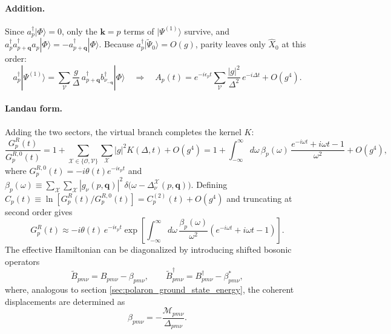 \paragraph{Addition.}
Since $a_p^\dagger|\Phi\rangle=0$, only the $\bm k=p$ terms of $|\Psi^{(1)}\rangle$ survive, and $a_p^\dagger a^\dagger_{p+\bm q}a_p|\Phi\rangle=-a^\dagger_{p+\bm q}|\Phi\rangle$. Because $a_p^\dagger|\tilde\Psi_0\rangle=O(g)$, parity leaves only $\hat X_0$ at this order:
\begin{equation}
a_p^\dagger|\Psi^{(1)}\rangle=\sum_{\mathcal V}\frac{g}{\Delta}\,a^\dagger_{p+\bm q}b^\dagger_{\nu_{-\bm q}}|\Phi\rangle
\quad\Longrightarrow\quad
A_p(t)=e^{-i\epsilon_pt}\sum_{\mathcal V}\frac{|g|^2}{\Delta^2}\,e^{-i\Delta t}+O(g^4).
\end{equation}

\paragraph{Landau form.}
Adding the two sectors, the virtual branch completes the kernel $K$:
\begin{equation}
\frac{G_p^R(t)}{G_p^{R,0}(t)}=1+\sum_{\mathcal X\in\{\mathcal O,\mathcal V\}}\sum_{\mathcal X}|g|^2K(\Delta,t)+O(g^4)
=1+\int_{-\infty}^{\infty}d\omega\,\beta_p(\omega)\,\frac{e^{-i\omega t}+i\omega t-1}{\omega^2}+O(g^4),
\end{equation}
where $G_p^{R,0}(t)=-i\theta(t)e^{-i\epsilon_pt}$ and
$\beta_p(\omega)\equiv\sum_{\mathcal X}\sum_{\mathcal X}|g_\nu(p,\bm q)|^2\,\delta\big(\omega-\Delta^{\mathcal X}_\nu(p,\bm q)\big)$.
Defining $C_p(t)\equiv\ln[G_p^R(t)/G_p^{R,0}(t)]=C_p^{(2)}(t)+O(g^4)$ and truncating at second order gives
\begin{equation}
G_p^R(t)\approx-i\theta(t)\,e^{-i\epsilon_pt}\exp\!\left[\int_{-\infty}^{\infty}d\omega\,\frac{\beta_p(\omega)}{\omega^2}\left(e^{-i\omega t}+i\omega t-1\right)\right].
\end{equation}
 The effective Hamiltonian can be diagonalized by introducing shifted bosonic operators
\begin{equation}
\widetilde B_{pm\nu}
=
B_{pm\nu}
-
\beta_{pm\nu},
\qquad
\widetilde B_{pm\nu}^{\dagger}
=
B_{pm\nu}^{\dagger}
-
\beta_{pm\nu}^{*},
\end{equation}
where, analogous to section \ref{sec:polaron_ground_state_energy}, the coherent displacements are determined as
\begin{equation}
\beta_{pm\nu}
=
-
\frac{\mathcal{M}_{pm\nu}}
{\Delta_{pm\nu}}.
\end{equation}
